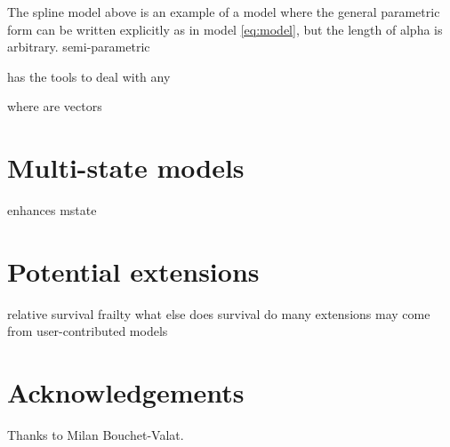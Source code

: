 \documentclass[nojss,nofooter]{jss}\usepackage[]{graphicx}\usepackage[]{color}
\begin{document}
The spline model above is an example of a model where the general
parametric form can be written explicitly as in model \ref{eq:model},
but the length of alpha is arbitrary.  semi-parametric 

 has the tools to deal with any 

where are vectors



\section{Multi-state models}

enhances mstate

\section{Potential extensions}

relative survival
frailty 
what else does survival do 
many extensions may come from user-contributed models


\appendix
\section{Acknowledgements}
Thanks to Milan Bouchet-Valat.


\end{document}
